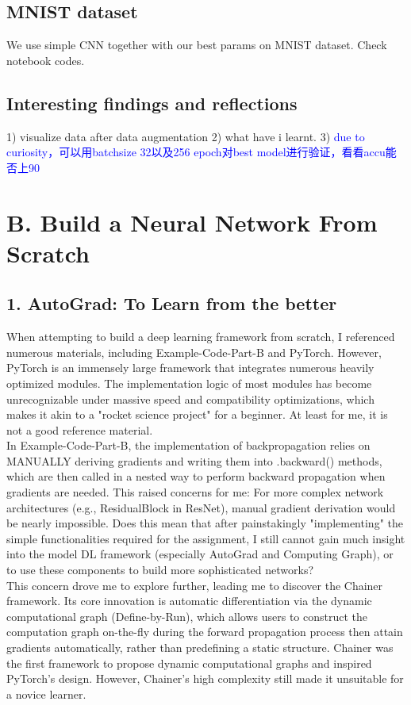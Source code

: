 \documentclass{article}
\newcommand{\subs}[1]{\subsection*{#1}}
\newcommand{\secs}[1]{\section*{#1}}
\begin{document}
\subs{MNIST dataset}
We use simple CNN together with our best params on MNIST dataset. Check notebook codes.


\subs{Interesting findings and reflections}
1) visualize data after data augmentation
2) what have i learnt.
3) \textcolor{blue}{due to curiosity，可以用batchsize 32以及256 epoch对best model进行验证，看看accu能否上90}

\newpage
\secs{B. Build a Neural Network From Scratch}
\subs{1. AutoGrad: To Learn from the better}
When attempting to build a deep learning framework from scratch, I referenced numerous materials, including Example-Code-Part-B and PyTorch. However, PyTorch is an immensely large framework that integrates numerous heavily optimized modules. The implementation logic of most modules has become unrecognizable under massive speed and compatibility optimizations, which makes it akin to a "rocket science project" for a beginner. At least for me, it is not a good reference material.\\

In Example-Code-Part-B, the implementation of backpropagation relies on MANUALLY deriving gradients and writing them into .backward() methods, which are then called in a nested way to perform backward propagation when gradients are needed. This raised concerns for me: For more complex network architectures (e.g., ResidualBlock in ResNet), manual gradient derivation would be nearly impossible. Does this mean that after painstakingly "implementing" the simple functionalities required for the assignment, I still cannot gain much insight into the model DL framework (especially AutoGrad and Computing Graph), or to use these components to build more sophisticated networks?\\

This concern drove me to explore further, leading me to discover the Chainer framework. Its core innovation is automatic differentiation via the dynamic computational graph (Define-by-Run), which allows users to construct the computation graph on-the-fly during the forward propagation process then attain gradients automatically, rather than predefining a static structure. Chainer was the first framework to propose dynamic computational graphs and inspired PyTorch's design. However, Chainer's high complexity still made it unsuitable for a novice learner.\\
\end{document}
